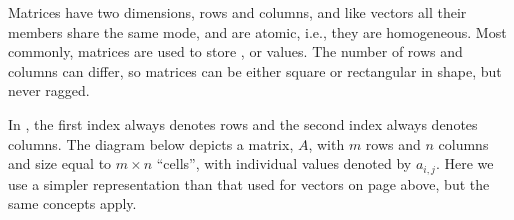 \documentclass[krantz2]{krantz}\usepackage{knitr}
\begin{document}
Matrices have two dimensions, rows and columns, and like vectors all their members share the same mode, and are atomic, i.e., they are homogeneous. Most commonly, matrices are used to store ,  or  values. The number of rows and columns can differ, so matrices can be either square or rectangular in shape, but never ragged.

In \Rlang, the first index always denotes rows and the second index always denotes columns. The diagram below depicts a matrix, $A$, with $m$ rows and $n$ columns and size equal to $m \times n$ ``cells'', with individual values denoted by $a_{i,j}$. Here we use a simpler representation than that used for vectors on page \pageref{par:calc:vectors:diag} above, but the same concepts apply.

\begin{center}
\begin{small}
\end{small}
\end{center}\label{fig:matrix:margins}
\end{document}

